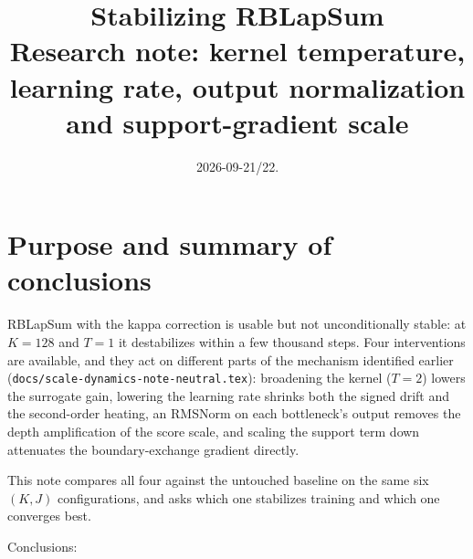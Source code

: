 \documentclass[11pt,a4paper]{article}
\title{Stabilizing RBLapSum \code{through\_rank\_kappa}\\[2pt]
\large Research note: kernel temperature, learning rate, output
normalization and support-gradient scale}
\author{}
\date{2026-09-21/22.}
\newcommand{\code}[1]{\texttt{#1}}
\begin{document}
\maketitle
\vspace{-2em}

\section{Purpose and summary of conclusions}

RBLapSum with the kappa correction is usable but not unconditionally stable:
at $K=128$ and $T=1$ it destabilizes within a few thousand steps. Four
interventions are available, and they act on different parts of the
mechanism identified earlier
(\code{docs/scale-dynamics-note-neutral.tex}): broadening the kernel
($T=2$) lowers the surrogate gain, lowering the learning rate shrinks both
the signed drift and the second-order heating, an RMSNorm on each
bottleneck's output removes the depth amplification of the score scale, and
scaling the support term down attenuates the boundary-exchange gradient
directly.

This note compares all four against the untouched baseline on the same
six $(K,J)$ configurations, and asks which one stabilizes training and
which one converges best.

Conclusions:
\end{document}
